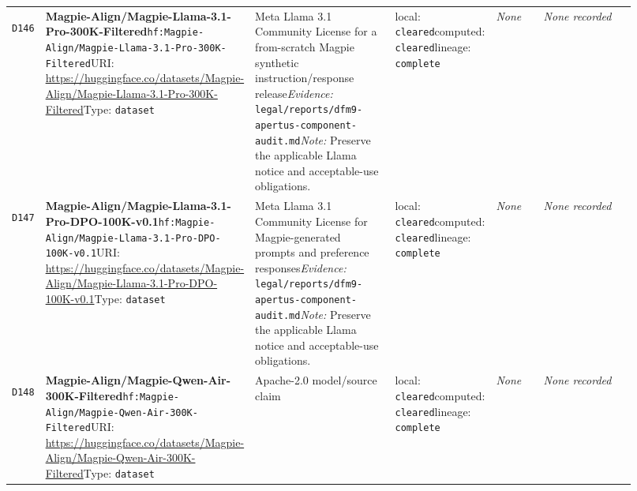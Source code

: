 \documentclass[9pt,a4paper]{article}
\newcommand{\depid}[1]{\hypertarget{dep:#1}{\texttt{#1}}}
\begin{document}
\begin{landscape}
\begin{longtable}{@{}L{0.035\linewidth}L{0.185\linewidth}L{0.27\linewidth}L{0.09\linewidth}L{0.10\linewidth}L{0.24\linewidth}@{}}
\depid{D146} & \textbf{Magpie-Align/Magpie-Llama-3.1-Pro-300K-Filtered}\newline \nolinkurl{hf:Magpie-Align/Magpie-Llama-3.1-Pro-300K-Filtered}\newline URI: \url{https://huggingface.co/datasets/Magpie-Align/Magpie-Llama-3.1-Pro-300K-Filtered}\newline Type: \texttt{dataset} & Meta Llama 3.1 Community License for a from-scratch Magpie synthetic instruction/response release\newline \textit{Evidence:} \nolinkurl{legal/reports/dfm9-apertus-component-audit.md}\newline \textit{Note:} Preserve the applicable Llama notice and acceptable-use obligations. & local: \texttt{cleared}\newline computed: \texttt{cleared}\newline lineage: \texttt{complete} & \textit{None} & \textit{None recorded} \\
\depid{D147} & \textbf{Magpie-Align/Magpie-Llama-3.1-Pro-DPO-100K-v0.1}\newline \nolinkurl{hf:Magpie-Align/Magpie-Llama-3.1-Pro-DPO-100K-v0.1}\newline URI: \url{https://huggingface.co/datasets/Magpie-Align/Magpie-Llama-3.1-Pro-DPO-100K-v0.1}\newline Type: \texttt{dataset} & Meta Llama 3.1 Community License for Magpie-generated prompts and preference responses\newline \textit{Evidence:} \nolinkurl{legal/reports/dfm9-apertus-component-audit.md}\newline \textit{Note:} Preserve the applicable Llama notice and acceptable-use obligations. & local: \texttt{cleared}\newline computed: \texttt{cleared}\newline lineage: \texttt{complete} & \textit{None} & \textit{None recorded} \\
\depid{D148} & \textbf{Magpie-Align/Magpie-Qwen-Air-300K-Filtered}\newline \nolinkurl{hf:Magpie-Align/Magpie-Qwen-Air-300K-Filtered}\newline URI: \url{https://huggingface.co/datasets/Magpie-Align/Magpie-Qwen-Air-300K-Filtered}\newline Type: \texttt{dataset} & Apache-2.0 model/source claim & local: \texttt{cleared}\newline computed: \texttt{cleared}\newline lineage: \texttt{complete} & \textit{None} & \textit{None recorded} \\

\end{longtable}
\end{landscape}
\end{document}
